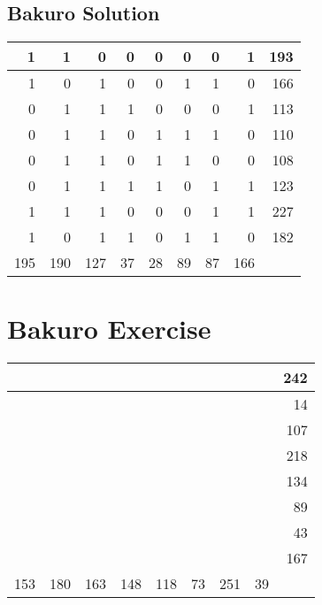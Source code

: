 \documentclass[]{article}
\begin{document}
 \subsection{Bakuro Solution} 
\begin{tabular}{rrrrrrrrr}
\hline
   1 &   1 &   0 &  0 &  0 &  0 &  0 &   1 & 193 \\ \hline
   1 &   0 &   1 &  0 &  0 &  1 &  1 &   0 & 166 \\ \hline
   0 &   1 &   1 &  1 &  0 &  0 &  0 &   1 & 113 \\ \hline
   0 &   1 &   1 &  0 &  1 &  1 &  1 &   0 & 110 \\ \hline
   0 &   1 &   1 &  0 &  1 &  1 &  0 &   0 & 108 \\ \hline
   0 &   1 &   1 &  1 &  1 &  0 &  1 &   1 & 123 \\ \hline
   1 &   1 &   1 &  0 &  0 &  0 &  1 &   1 & 227 \\ \hline
   1 &   0 &   1 &  1 &  0 &  1 &  1 &   0 & 182 \\ \hline
 195 & 190 & 127 & 37 & 28 & 89 & 87 & 166 &     \\ \hline
\hline
\end{tabular}\newpage\section{Bakuro Exercise}\begin{tabular}{rrrrrrrrr}
\hline
     &     &     &     &     &    &     &    & 242 \\ \hline
     &     &     &     &     &    &     &    &  14 \\ \hline
     &     &     &     &     &    &     &    & 107 \\ \hline
     &     &     &     &     &    &     &    & 218 \\ \hline
     &     &     &     &     &    &     &    & 134 \\ \hline
     &     &     &     &     &    &     &    &  89 \\ \hline
     &     &     &     &     &    &     &    &  43 \\ \hline
     &     &     &     &     &    &     &    & 167 \\ \hline
 153 & 180 & 163 & 148 & 118 & 73 & 251 & 39 &     \\ \hline
\hline
\end{tabular}\newpage 
\end{document}
